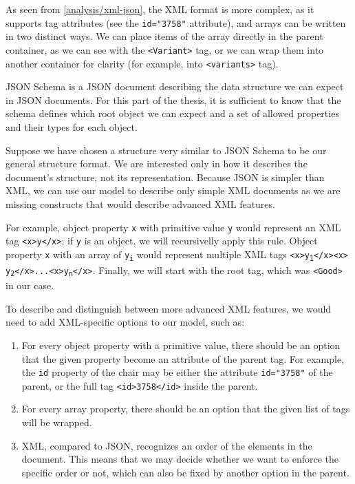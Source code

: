 As seen from \autoref{analysis/xml-json}, the XML format is more complex, as it supports tag attributes (see the \verb|id="3758"| attribute), and arrays can be written in two distinct ways. We can place items of the array directly in the parent container, as we can see with the \verb|<Variant>| tag, or we can wrap them into another container for clarity (for example, into \verb|<variants>| tag).

\smallskip

JSON Schema is a JSON document describing the data structure we can expect in JSON documents. For this part of the thesis, it is sufficient to know that the schema defines which root object we can expect and a set of allowed properties and their types for each object.

Suppose we have chosen a structure very similar to JSON Schema to be our general structure format. We are interested only in how it describes the document's structure, not its representation. Because JSON is simpler than XML, we can use our model to describe only simple XML documents as we are missing constructs that would describe advanced XML features.

For example,
object property {\tt x} with primitive value {\tt y} would represent an XML tag {\tt <x>y</x>}; if {\tt y} is an object, we will recursivelly apply this rule.
Object property {\tt x} with an array of {\tt y\textsubscript{i}}  would represent multiple XML tags {\tt<x>y\textsubscript{1}</x><x>\nobreak\hfil{} \hfilneg y\textsubscript{2}</x>...<x>y\textsubscript{n}</x>}.
Finally, we will start with the root tag, which was {\tt <Good>} in our case.

To describe and distinguish between more advanced XML features, we would need to add XML-specific options to our model, such as:
\begin{enumerate}
  \item For every object property with a primitive value, there should be an option that the given property become an attribute of the parent tag. For example, the \verb|id| property of the chair may be either the attribute \verb|id="3758"| of the parent, or the full tag \verb|<id>3758</id>| inside the parent.
  \item For every array property, there should be an option that the given list of tags will be wrapped.
  \item XML, compared to JSON, recognizes an order of the elements in the document. This means that we may decide whether we want to enforce the specific order or not, which can also be fixed by another option in the parent.
\end{enumerate}

